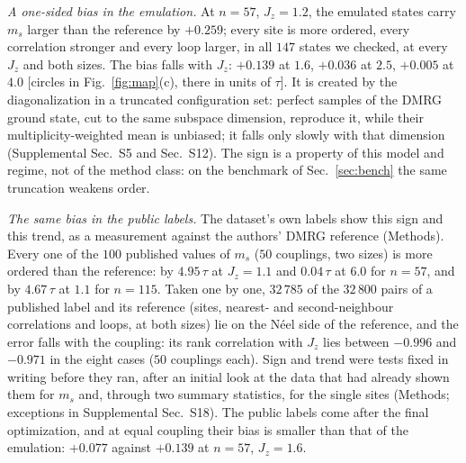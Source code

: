 \documentclass[aps,prx,twocolumn,10pt,superscriptaddress,nofootinbib,longbibliography,floatfix]{revtex4-2}
\theoremstyle{remark}
\newcommand{\Jz}{J_z}
\newcommand{\ms}{m_s}
\begin{document}
\emph{A one-sided bias in the emulation.} At $n=57$, $\Jz=1.2$, the emulated states carry $\ms$ larger than %
the reference by $+0.259$; every site is more ordered, every correlation stronger and every loop larger, in all %
$147$ states we checked, at every $\Jz$ and both sizes. The bias %
falls with $\Jz$: $+0.139$ at $1.6$, $+0.036$ at $2.5$, $+0.005$ at $4.0$ [circles in Fig.~\ref{fig:map}(c), there in units of $\tau$]. It is created by %
the diagonalization in a truncated configuration set: perfect samples of the DMRG ground state, cut to the same
subspace dimension, reproduce it, while their multiplicity-weighted mean is unbiased; it falls only slowly with
that dimension (Supplemental Sec.~S5 and Sec.~S12). The sign is a property of this model
and regime, not of the method class: on the benchmark of Sec.~\ref{sec:bench} the same truncation weakens order.

\emph{The same bias in the public labels.} The dataset's own labels show this sign and this trend, as a measurement
against the authors' DMRG reference (Methods). Every one of the $100$ published values of $\ms$ ($50$ couplings, two sizes) is more %
ordered than the reference: by $4.95\,\tau$ at $\Jz=1.1$ and $0.04\,\tau$ at $6.0$ for $n=57$, and by $4.67\,\tau$ %
at $1.1$ for $n=115$. Taken one by one, $32\,785$ of the $32\,800$ pairs of a published label and its reference %
(sites, nearest- and second-neighbour correlations and loops, at both sizes) lie on the N\'eel side of the
reference, and the error falls with the coupling: its rank correlation with $\Jz$ lies between $-0.996$ and %
$-0.971$ in the eight cases ($50$ couplings each). Sign and trend were tests fixed in writing before they ran, after an initial look at %
the data that had already shown them for $\ms$ and, through two summary statistics, for the single sites (Methods;
exceptions in Supplemental Sec.~S18). The
public labels come after the final optimization, and at equal coupling their bias is smaller than that of the
emulation: $+0.077$ against $+0.139$ at $n=57$, $\Jz=1.6$. %
\end{document}
